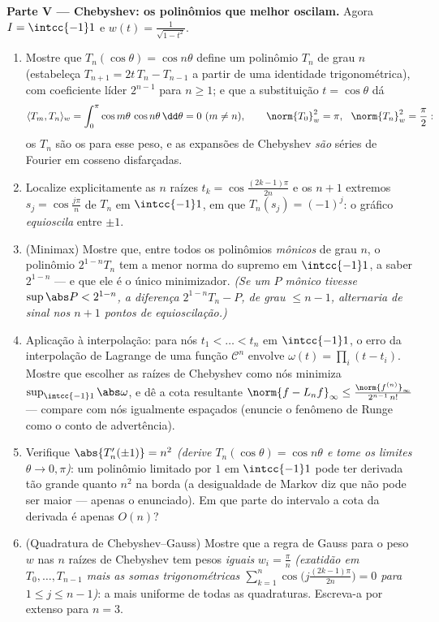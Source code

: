 \begin{problem}
\medskip
\noindent\textbf{Parte V --- Chebyshev: os polinômios que melhor
oscilam.} Agora $I = \intcc{-1}1$ e $w(t) =
\frac1{\sqrt{1 - t^2}}$.
\begin{enumerate}[resume]
  \item Mostre que $T_n(\cos\theta) = \cos n\theta$ define um polinômio $T_n$ de grau $n$
        (estabeleça $T_{n+1} =
        2t\,T_n - T_{n-1}$ a partir de uma identidade trigonométrica),
        com coeficiente líder $2^{n-1}$ para $n \geq 1$; e que a substituição
        $t = \cos\theta$ dá
        \[
        \langle T_m, T_n\rangle_w =
        \int_0^\pi\cos m\theta\,\cos n\theta\,\dd\theta
        = 0 \ (m \neq n), \qquad
        \norm{T_0}_w^2 = \pi,\ \ \norm{T_n}_w^2 = \frac\pi2 :
        \]
        os $T_n$ são os  para esse peso, e as
        expansões de Chebyshev \emph{são} séries de Fourier em cosseno
        disfarçadas.
  \item Localize explicitamente as $n$ raízes $t_k =
        \cos\frac{(2k-1)\pi}{2n}$ e os $n + 1$
        extremos $s_j = \cos\frac{j\pi}n$ de $T_n$ em $\intcc{-1}1$, em que $T_n(s_j) = (-1)^j$: o gráfico
        \emph{equioscila} entre $\pm1$.
  \item (Minimax) Mostre que, entre todos os polinômios \emph{mônicos}
        de grau $n$, o polinômio $2^{1-n}T_n$ tem a menor norma do supremo
        em $\intcc{-1}1$, a saber $2^{1-n}$ --- e que ele é o único minimizador.
        \emph{(Se um $P$ mônico tivesse $\sup\abs P < 2^{1-n}$, a diferença $2^{1-n}T_n -
        P$, de
        grau $\leq n-1$, alternaria de sinal nos $n+1$ pontos de
        equioscilação.)}
  \item Aplicação à interpolação: para nós $t_1 < \dots
        < t_n$ em $\intcc{-1}1$, o erro da
        interpolação de Lagrange de uma função $\mathcal C^n$ envolve $\omega(t) = \prod_i(t - t_i)$.
        Mostre que escolher as raízes de Chebyshev como nós minimiza
        $\sup_{\intcc{-1}1}\abs\omega$, e dê a cota resultante $\norm{f -
        L_nf}_\infty \leq \frac{\norm{f^{(n)}}_\infty}
        {2^{n-1}\,n!}$ --- compare com nós
        igualmente espaçados (enuncie o fenômeno de Runge como o conto
        de advertência).
  \item Verifique $\abs{T_n'(\pm1)} = n^2$ \emph{(derive $T_n(\cos\theta) = \cos n\theta$ e tome os limites $\theta \to 0, \pi$)}: um
        polinômio limitado por $1$ em $\intcc{-1}1$ pode ter derivada tão
        grande quanto $n^2$ na borda (a desigualdade de Markov diz
        que não pode ser maior --- apenas o enunciado). Em que parte do
        intervalo a cota da derivada é apenas $O(n)$?
  \item (Quadratura de Chebyshev--Gauss) Mostre que a regra de Gauss
        para o peso $w$ nas $n$ raízes de Chebyshev tem pesos
        \emph{iguais} $w_i = \frac\pi n$ \emph{(exatidão em $T_0, \dots, T_{n-1}$ mais as somas
        trigonométricas $\sum_{k=1}^n\cos\bigl(j\tfrac{(2k-1)\pi}{2n}\bigr) =
        0$ para $1 \leq j \leq n - 1$)}: a mais uniforme de todas as
        quadraturas. Escreva-a por extenso para $n = 3$.
\end{enumerate}


\end{problem}
